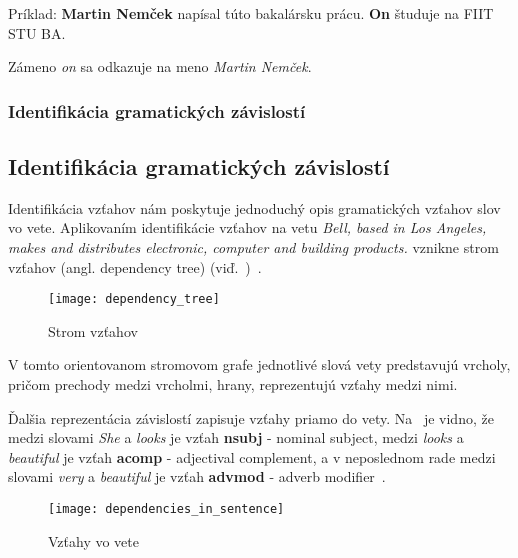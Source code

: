 Príklad:
\textbf{Martin Nemček} napísal túto bakalársku prácu. \textbf{On} študuje na FIIT STU BA.

Zámeno \textit{on} sa odkazuje na meno \textit{Martin Nemček}.

%
%
{
	\subsubsection{Identifikácia gramatických závislostí}
}
{
	\subsection{Identifikácia gramatických závislostí}
}
\label{subsubsec:dependencyparsing}
Identifikácia vzťahov nám poskytuje jednoduchý opis gramatických vzťahov slov vo vete. Aplikovaním identifikácie vzťahov na vetu \textit{Bell, based in Los
Angeles, makes and distributes electronic, computer and building products.
} vznikne strom vzťahov (angl. dependency tree) (viď.~)~\cite{StanfordDepManual}.

\begin{figure}[H]
\begin{center}\texttt{[image: dependency\_tree]}\end{center}
\caption[Strom vzťahov]{Strom vzťahov}\label{fig:dependency_tree}
\end{figure}

V tomto orientovanom stromovom grafe jednotlivé slová vety predstavujú vrcholy, pričom prechody medzi vrcholmi, hrany, reprezentujú vzťahy medzi nimi.

Ďalšia reprezentácia závislostí zapisuje vzťahy priamo do vety. Na~ je vidno, že medzi slovami \textit{She} a \textit{looks} je vzťah \textbf{nsubj} - nominal subject, medzi \textit{looks} a \textit{beautiful} je vzťah \textbf{acomp} - adjectival complement, a v neposlednom rade medzi slovami \textit{very} a \textit{beautiful} je vzťah \textbf{advmod} - adverb modifier~\cite{StanfordDepManual}.

\begin{figure}[H]
\begin{center}\texttt{[image: dependencies\_in\_sentence]}\end{center}
\caption[Vzťahy vo vete]{Vzťahy vo vete}\label{fig:dependencies_in_sentence}
\end{figure}

